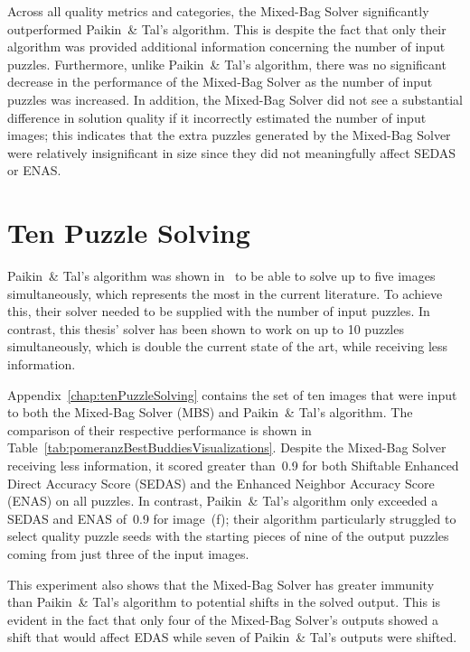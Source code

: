 Across all quality metrics and categories, the Mixed-Bag Solver significantly outperformed Paikin~\& Tal's algorithm.  This is despite the fact that only their algorithm was provided additional information concerning the number of input puzzles.  Furthermore, unlike Paikin~\& Tal's algorithm, there was no significant decrease in the performance of the Mixed-Bag Solver as the number of input puzzles was increased.  In addition, the Mixed-Bag Solver did not see a substantial difference in solution quality if it incorrectly estimated the number of input images; this indicates that the extra puzzles generated by the Mixed-Bag Solver were relatively insignificant in size since they did not meaningfully affect SEDAS or ENAS.  

\section{Ten Puzzle Solving}

Paikin~\& Tal's algorithm was shown in~\cite{paikin2015} to be able to solve up to five images simultaneously, which represents the most in the current literature.  To achieve this, their solver needed to be supplied with the number of input puzzles.  In contrast, this thesis' solver has been shown to work on up to 10 puzzles simultaneously, which is double the current state of the art, while receiving less information.

Appendix~\ref{chap:tenPuzzleSolving} contains the set of ten images that were input to both the Mixed-Bag Solver (MBS) and Paikin~\& Tal's algorithm.  The comparison of their respective performance is shown in Table~\ref{tab:pomeranzBestBuddiesVisualizations}.  Despite the Mixed-Bag Solver receiving less information, it scored greater than~0.9 for both Shiftable Enhanced Direct Accuracy Score (SEDAS) and the Enhanced Neighbor Accuracy Score (ENAS) on all puzzles.  In contrast, Paikin~\& Tal's algorithm only exceeded a SEDAS and ENAS of~0.9 for image~(f); their algorithm particularly struggled to select quality puzzle seeds with the starting pieces of nine of the output puzzles coming from just three of the input images.

This experiment also shows that the Mixed-Bag Solver has greater immunity than Paikin~\& Tal's algorithm to potential shifts in the solved output.  This is evident in the fact that only four of the Mixed-Bag Solver's outputs showed a shift that would affect EDAS while seven of Paikin~\& Tal's outputs were shifted.

